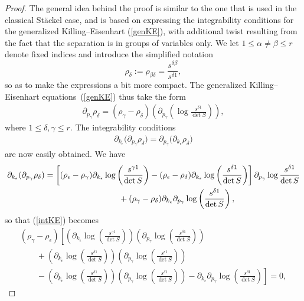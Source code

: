 \documentclass[pdftex]{sigma}
\numberwithin{equation}{section}
\newcommand{\pgamma}{p_{\gamma}}
\newcommand{\kepsilon}{k_{\epsilon}}
\newcommand{\rhoepsilon}{\rho_{\epsilon}}
\newcommand{\rhogamma}{\rho_{\gamma}}
\newcommand{\rhodelta}{\rho_{\delta}}
\begin{document}
\begin{proof}
The general idea behind the proof is similar to the one that is used in the classical St\"ackel case, and is based on expressing the integrability conditions for the generalized Killing--Eisenhart (\ref{genKE}), with additional twist resulting from the fact that the separation is in groups of variables only. We let $1\leq \alpha \neq \beta \leq r$ denote fixed indices and introduce the simplified notation
\[
\rho_{\delta}:=\rho_{ \beta \delta}=\frac{s^{\delta \beta}}{s^{\delta 1}},
\]
so as to make the expressions a bit more compact. The generalized Killing--Eisenhart equa\-tions~(\ref{genKE}) thus take the form
\begin{gather*}%
\partial_{\pgamma} \rho_{\delta}= (\rho_{\gamma}-\rho_{\delta })\left(\partial_{\pgamma}\left(\log \frac{s^{\delta 1}}{\det S}\right)\right),
\end{gather*}
where $1\leq \delta,\gamma \leq r$. The integrability conditions
\begin{gather}\label{intKE}
\partial_{\kepsilon}\big(\partial_{\pgamma} \rhodelta \big)=\partial_{\pgamma}\big(\partial_{\kepsilon} \rhodelta \big)
\end{gather}
are now easily obtained. We have
\begin{gather*}
\partial_{\kepsilon} (\partial_{\pgamma} \rhodelta )= \left[(\rhoepsilon-\rhogamma)\partial_{\kepsilon}\log\left(\frac{s^{\gamma 1}}{\det S}\right)-(\rhoepsilon-\rhodelta)\partial_{\kepsilon}\log\left(\frac{s^{\delta 1}}{\det S}\right)\right] \partial_{\pgamma} \log \frac{s^{\delta 1}}{\det S} \\
\hphantom{\partial_{\kepsilon} (\partial_{\pgamma} \rhodelta )=}{} + (\rhogamma-\rhodelta)\partial_{\kepsilon}\partial_{\pgamma}\log\left(\frac{s^{\delta 1}}{\det S}\right),
\end{gather*}
so that (\ref{intKE}) becomes
\begin{gather}
(\rho_{\gamma}-\rho_{\epsilon})\left[\left(\partial_{\kepsilon}\log\left(\frac{s^{\gamma 1}}{\det S}\right)\right)\left(\partial_{\pgamma}\log\left(\frac{s^{\delta 1}}{\det S}\right)\right)\right.\nonumber\\
\qquad{} +\left(\partial_{\kepsilon}\log\left(\frac{s^{\delta 1}}{\det S}\right)\right)\left(\partial_{\pgamma}\log\left(\frac{s^{\epsilon 1}}{\det S}\right)\right) \nonumber\\
\left.\qquad{} -\left(\partial_{\kepsilon}\log\left(\frac{s^{\delta 1}}{\det S}\right)\right)\left(\partial_{\pgamma}\log\left(\frac{s^{\delta 1}}{\det S}\right)\right)-\partial_{\kepsilon}\partial_{\pgamma}\log\left(\frac{s^{\delta 1}}{\det S}\right)\right]=0,\label{compat}

\end{gather}
\end{proof}
\end{document}
